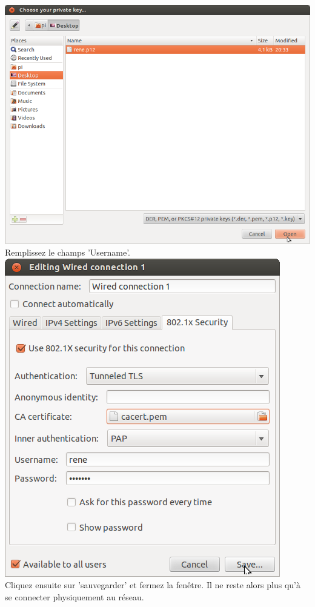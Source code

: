 \includegraphics[width=\screenShotSize{}]{imgUser/selectP12.png}\\
Remplissez le champs 'Username'.\\
\includegraphics[width=\screenShotSize{}]{imgUser/ttls.png}\\
Cliquez ensuite sur 'sauvegarder' et fermez la fenêtre.
Il ne reste alors plus qu'à se connecter physiquement au réseau.\\





